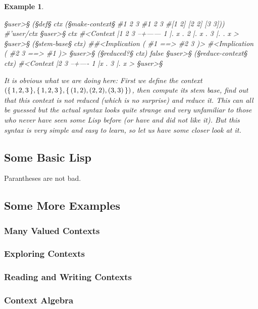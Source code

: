 \documentclass{scrbook}
\newcommand{\set}[1]{\{\,#1\,\}}
\newcommand{\s}{\color{blue}}
\newcommand{\p}{\color{lightblue}}
\theoremstyle{plain}
\theoremstyle{plain}
\newtheorem{Example}     [Theorem] {Example}
\theoremstyle{plain}
\theoremstyle{nonumberplain}
\begin{document}
\begin{Example}~
\begin{conexp}
  §\p user>§ (§\s def§ ctx (§\s make-context§ #{1 2 3} #{1 2 3} #{[1 2] [2 2] [3 3]}))
  #'user/ctx
  §\p user>§ ctx
  #<Context
    |1 2 3
  --+------
  1 |. x .
  2 |. x .
  3 |. . x
  >
  §\p user>§ (§\s stem-base§ ctx)
  #{#<Implication ( #{1}  ==>  #{2 3} )> #<Implication ( #{2 3}  ==>  #{1} )>}
  §\p user>§ (§\s reduced?§ ctx)
  false
  §\p user>§ (§\s reduce-context§ ctx)
  #<Context
    |2 3
  --+----
  1 |x .
  3 |. x
  >
  §\p user>§
\end{conexp}

It is obvious what we are doing here: First we define the context
$(\set{1,2,3},\set{1,2,3},\break\set{(1,2),(2,2),(3,3)})$, then compute its stem base, find out that
this context is not reduced (which is no surprise) and reduce it. This can all be guessed but the
actual syntax looks quite strange and very unfamiliar to those who never have seen some Lisp before
(or have and did not like it). But this syntax is very simple and easy to learn, so let us have some
closer look at it.
\end{Example}

\subsection{Some Basic Lisp}
Parantheses are not bad.

\subsection{Some More Examples}

\subsubsection{Many Valued Contexts}

\subsubsection{Exploring Contexts}

\subsubsection{Reading and Writing Contexts}

\subsubsection{Context Algebra}
\end{document}
